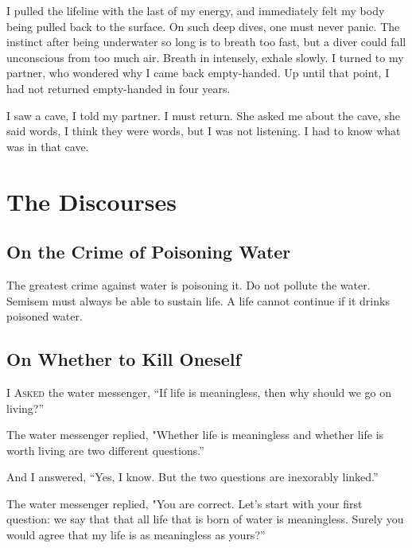 \documentclass[12pt, letterpaper]{report}
\begin{document}
\vspace{1\baselineskip}
I pulled the lifeline with the last of my energy, and immediately felt my body being pulled back to the surface. On such deep dives, one must never panic. The instinct after being underwater so long is to breath too fast, but a diver could fall unconscious from too much air. Breath in intensely, exhale slowly. I turned to my partner, who wondered why I came back empty-handed. Up until that point, I had not returned empty-handed in four years. 

\vspace{1\baselineskip}
I saw a cave, I told my partner. I must return. She asked me about the cave, she said words, I think they were words, but I was not listening. I had to know what was in that cave.


\part{The Discourses}

\chapter{On the Crime of Poisoning Water}

The greatest crime against water is poisoning it. Do not pollute the water. Semisem must always be able to sustain life. A life cannot continue if it drinks poisoned water. 

\chapter{On Whether to Kill Oneself}

\vspace{1\baselineskip}
I A\textsc{sked} the water messenger, ``If life is meaningless, then why should we go on living?''

\vspace{1\baselineskip}
The water messenger replied, "Whether life is meaningless and whether life is worth living are two different questions.''

\vspace{1\baselineskip}
And I answered, ``Yes, I know. But the two questions are inexorably linked.''

\vspace{1\baselineskip}
The water messenger replied, "You are correct. Let's start with your first question: we say that that all life that is born of water is meaningless. Surely you would agree that my life is as meaningless as yours?''
\end{document}
